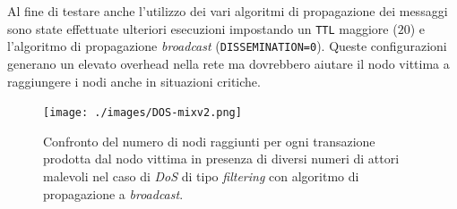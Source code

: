 Al fine di testare anche l'utilizzo dei vari algoritmi di propagazione dei messaggi sono state effettuate ulteriori esecuzioni impostando un \texttt{TTL} maggiore ($20$) e l'algoritmo di propagazione \textit{broadcast} (\texttt{DISSEMINATION=0}). Queste configurazioni generano un elevato overhead nella rete ma dovrebbero aiutare il nodo vittima a raggiungere i nodi anche in situazioni critiche.
\begin{figure}[H]
    \centering
    \texttt{[image: ./images/DOS-mixv2.png]}
    \caption{Confronto del numero di nodi raggiunti per ogni transazione prodotta dal nodo vittima in presenza di diversi numeri di attori malevoli nel caso di \textit{DoS} di tipo \textit{filtering} con algoritmo di propagazione a \textit{broadcast}.}
    \label{fig:dosmix}
\end{figure}

